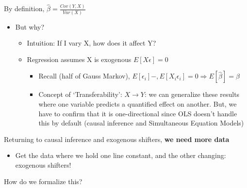\documentclass[10pt, oneside]{article}
\begin{document}
By definition, $\hat \beta = \frac{Cov(Y,X)}{Var(X)}$
\begin{itemize}
    \item But why?
    \begin{itemize}
        \item Intuition: If I vary X, how does it affect Y?
        \item Regression assumes X is exogenous $E[X\epsilon] = 0$
        \begin{itemize}
            \item Recall (half of Gauss Markov), $E[\epsilon_i] -, E[X_i\epsilon_i] = 0\Rightarrow E[\hat \beta] = \beta$
            \item Concept of `Transferability': $X\rightarrow Y$: we can generalize these results where one variable predicts a quantified effect on another. But, we have to confirm that it is one-directional since OLS doesn't handle this by default (causal inference and Simultaneous Equation Models)
        \end{itemize}
    \end{itemize}
\end{itemize}
Returning to causal inference and exogenous shifters, \textbf{we need more data}
\begin{itemize}
    \item Get the data where we hold one line constant, and the other changing: exogenous shifters!
\end{itemize}
How do we formalize this?
\end{document}
